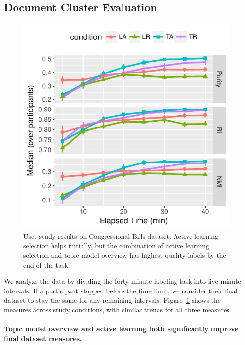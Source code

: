 \subsection{Document Cluster Evaluation}
\label{sub:cluster_results}



\begin{figure}[t!]
\includegraphics[width=\linewidth]{2016_acl_doclabel/auto_fig/user_exp_plot}
\caption{User study results on  Congressional Bills dataset. Active learning selection helps initially, but the combination of active learning selection and topic model overview has highest quality labels by the end of the task.}
\label{fig:results}
\end{figure}

We analyze the data by dividing the forty-minute labeling task into
five minute intervals. If a participant stopped before the time
limit, we consider their final dataset to stay the same for any
remaining intervals. Figure~\ref{fig:results} shows the
measures across study conditions, with similar trends for all three
measures.

\paragraph{Topic model overview and active learning both significantly improve final dataset measures.}

